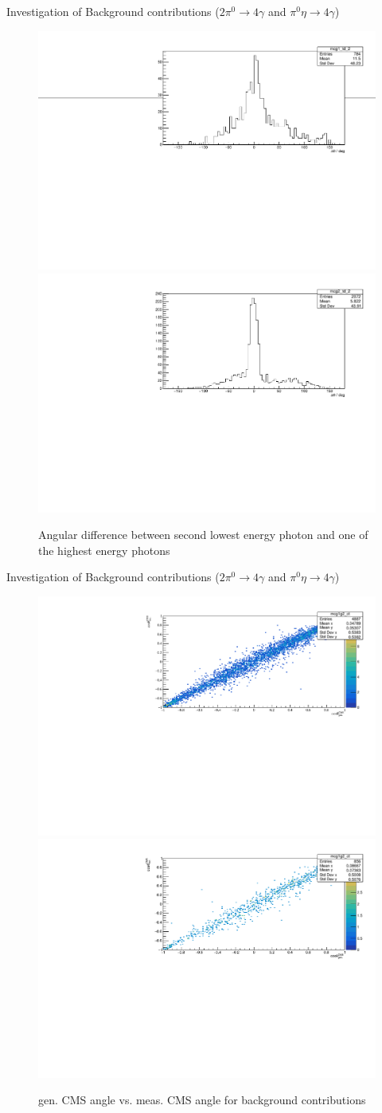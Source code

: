 \documentclass[11pt,aspectratio=169,dvipsnames]{beamer}
\begin{document}
\begin{frame}{Investigation of Background contributions ($2\pi^0\to4\gamma$ and $\pi^0\eta\to4\gamma$)}
	\begin{figure}
		\includegraphics[width=.49\linewidth]{../../figs/hydrogen/mctd_2_2pi0.pdf}
		\includegraphics[width=.49\linewidth]{../../figs/hydrogen/mctd_2_pi0eta.pdf}
		\caption*{Angular difference between second lowest energy photon and one of the highest energy photons }
	\end{figure}
\end{frame}
\begin{frame}{Investigation of Background contributions ($2\pi^0\to4\gamma$ and $\pi^0\eta\to4\gamma$)}
	\begin{figure}
		\includegraphics[width=.49\linewidth]{../../figs/hydrogen/costheta_2pi0.pdf}
		\includegraphics[width=.49\linewidth]{../../figs/hydrogen/costheta_pi0eta.pdf}
		\caption*{gen. CMS angle vs. meas. CMS angle for background contributions}
	\end{figure}
\end{frame}
\end{document}
